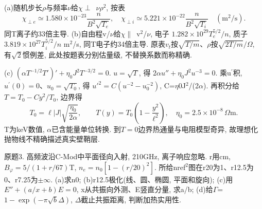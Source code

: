 \begin{solution}
(a)随机步长\ensuremath{\rho}与频率\ensuremath{\nu}给\ensuremath{\chi}\ensuremath{\perp}~\ensuremath{\nu}\ensuremath{\rho}\ensuremath{{}^{2}}, 按表
\begin{equation}
 \chi_{\perp e}\simeq1.580\times10^{-23}\frac n{B^2\sqrt{T_e}},\quad
 \chi_{\perp i}\simeq5.221\times10^{-22}\frac n{B^2\sqrt{T_i}}\quad(\mathrm m^2/\mathrm s).
\end{equation}
同T离子约33倍主导. (b)自由程v/\ensuremath{\nu}给\ensuremath{\chi}\ensuremath{\parallel}~v\ensuremath{{}^{2}}/\ensuremath{\nu}, 电子 $1.282\times10^{29}T_e^{5/2}/n$, 质子 $3.819\times10^{27}T_i^{5/2}/n$ m\ensuremath{{}^{2}}/s, 同T电子约34倍主导. 原表$v_t$按$\sqrt{T/m}$、$\rho$按$\sqrt{2T/m}/\Omega$, 有$\sqrt2$惯例差, 此处按题表分别估量级, 不替换系数而称精确.

(c) $(\alpha T^{-1/2}T')'+\eta_0J^2T^{-3/2}=0$. $u=\sqrt T$, 得 $2\alpha u''+\eta_0J^2u^{-3}=0$. 乘u\ensuremath{{}^{\prime}}积, $u^{\prime}(0)=0$、$u_0=\sqrt{T_0}$, 得 $u'^2=C(u^{-2}-u_0^{-2})$, C=\ensuremath{\eta}0J\ensuremath{{}^{2}}/(2\ensuremath{\alpha}). 再积分给 $T=T_0-Cy^2/T_0$, 边界得
\begin{equation}
 T_0=\ell|J|\sqrt{\frac{\eta_0}{2\alpha}},\qquad
 T(y)=T_0\left(1-\frac{y^2}{\ell^2}\right),\quad \eta_0=2.5\times10^{-8}\,\Omega\mathrm m.
\end{equation}
T为keV数值, \ensuremath{\alpha}已含能量单位转换. 到$T=0$边界热通量与电阻模型奇异, 故理想化抛物线不精确描述真实壁鞘层.
\end{solution}
\begin{exercise}\label{ex:06-final-3}
原题3. 高频波沿C-Mod中平面径向入射, 210GHz, 离子响应忽略. r用cm, $B_\varphi=5/(1+r/67)$T, $n_e=n_0[1-(r/20)^2]$. 所给nref\ensuremath{{}^{2}}图在r20为1、r12.5为0、r7.25为\ensuremath{\pm}\ensuremath{\infty}. (a)求n0; (b)r12.5极化(线、圆、椭圆, 平面和旋向); (c)用 $E''+(a/x+b)E=0$, x从共振向外测、E竖直分量, 求a/b; (d)给\ensuremath{\Gamma}=$1-\exp(-\pi\sqrt b\Delta)$, \ensuremath{\Delta}截止共振距离, 判断加热实用性.
\end{exercise}
